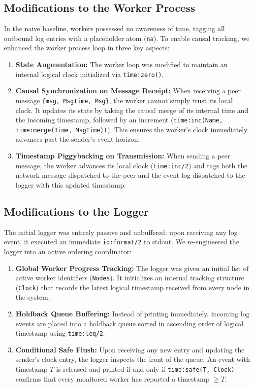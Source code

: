 \documentclass[a4paper, 11pt]{article}
\begin{document}
\subsection{Modifications to the Worker Process}
In the naive baseline, workers possessed no awareness of time, tagging all outbound log entries with a placeholder atom (\texttt{na}). To enable causal tracking, we enhanced the worker process loop in three key aspects:
\begin{enumerate}
    \item \textbf{State Augmentation:} The worker loop was modified to maintain an internal logical clock initialized via \texttt{time:zero()}.
    \item \textbf{Causal Synchronization on Message Receipt:} When receiving a peer message \texttt{\{msg, MsgTime, Msg\}}, the worker cannot simply trust its local clock. It updates its state by taking the causal merge of its internal time and the incoming timestamp, followed by an increment (\texttt{time:inc(Name, time:merge(Time, MsgTime))}). This ensures the worker's clock immediately advances past the sender's event horizon.
    \item \textbf{Timestamp Piggybacking on Transmission:} When sending a peer message, the worker advances its local clock (\texttt{time:inc/2}) and tags both the network message dispatched to the peer and the event log dispatched to the logger with this updated timestamp.
\end{enumerate}

\subsection{Modifications to the Logger}
The initial logger was entirely passive and unbuffered: upon receiving any log event, it executed an immediate \texttt{io:format/2} to stdout. We re-engineered the logger into an active ordering coordinator:
\begin{enumerate}
    \item \textbf{Global Worker Progress Tracking:} The logger was given an initial list of active worker identifiers (\texttt{Nodes}). It initializes an internal tracking structure (\texttt{Clock}) that records the latest logical timestamp received from every node in the system.
    \item \textbf{Holdback Queue Buffering:} Instead of printing immediately, incoming log events are placed into a holdback queue sorted in ascending order of logical timestamp using \texttt{time:leq/2}.
    \item \textbf{Conditional Safe Flush:} Upon receiving any new entry and updating the sender's clock entry, the logger inspects the front of the queue. An event with timestamp $T$ is released and printed if and only if \texttt{time:safe(T, Clock)} confirms that every monitored worker has reported a timestamp $\ge T$.
\end{enumerate}
\end{document}
